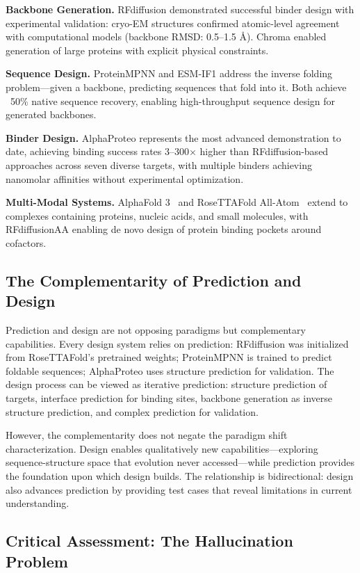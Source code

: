 \textbf{Backbone Generation.} RFdiffusion demonstrated successful binder design with experimental validation: cryo-EM structures confirmed atomic-level agreement with computational models (backbone RMSD: 0.5--1.5 \AA). Chroma enabled generation of large proteins with explicit physical constraints.

\textbf{Sequence Design.} ProteinMPNN and ESM-IF1 address the inverse folding problem---given a backbone, predicting sequences that fold into it. Both achieve ~50\% native sequence recovery, enabling high-throughput sequence design for generated backbones.

\textbf{Binder Design.} AlphaProteo represents the most advanced demonstration to date, achieving binding success rates 3--300$\times$ higher than RFdiffusion-based approaches across seven diverse targets, with multiple binders achieving nanomolar affinities without experimental optimization.

\textbf{Multi-Modal Systems.} AlphaFold 3~\cite{abramson2024alphafold3} and RoseTTAFold All-Atom~\cite{krishna2024rfaa} extend to complexes containing proteins, nucleic acids, and small molecules, with RFdiffusionAA enabling de novo design of protein binding pockets around cofactors.

\subsection{The Complementarity of Prediction and Design}

Prediction and design are not opposing paradigms but complementary capabilities. Every design system relies on prediction: RFdiffusion was initialized from RoseTTAFold's pretrained weights; ProteinMPNN is trained to predict foldable sequences; AlphaProteo uses structure prediction for validation. The design process can be viewed as iterative prediction: structure prediction of targets, interface prediction for binding sites, backbone generation as inverse structure prediction, and complex prediction for validation.

However, the complementarity does not negate the paradigm shift characterization. Design enables qualitatively new capabilities---exploring sequence-structure space that evolution never accessed---while prediction provides the foundation upon which design builds. The relationship is bidirectional: design also advances prediction by providing test cases that reveal limitations in current understanding.

\subsection{Critical Assessment: The Hallucination Problem}

